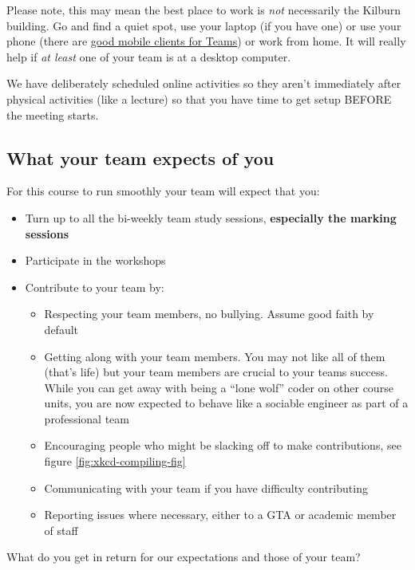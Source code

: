 \documentclass[
]{book}
\providecommand{\tightlist}{%
  \setlength{\itemsep}{0pt}\setlength{\parskip}{0pt}}
\begin{document}
Please note, this may mean the best place to work is \emph{not} necessarily the Kilburn building. Go and find a quiet spot, use your laptop (if you have one) or use your phone (there are \href{https://www.microsoft.com/en-gb/microsoft-teams/download-app}{good mobile clients for Teams}) or work from home. It will really help if \emph{at least} one of your team is at a desktop computer.

We have deliberately scheduled online activities so they aren't immediately after physical activities (like a lecture) so that you have time to get setup BEFORE the meeting starts.

\hypertarget{urteam}{%
\subsection{What your team expects of you}\label{urteam}}

For this course to run smoothly your team will expect that you:

\begin{itemize}
\tightlist
\item
  Turn up to all the bi-weekly team study sessions, \textbf{especially the marking sessions}
\item
  Participate in the workshops
\item
  Contribute to your team by:

  \begin{itemize}
  \tightlist
  \item
    Respecting your team members, no bullying. Assume good faith by default
  \item
    Getting along with your team members. You may not like all of them (that's life) but your team members are crucial to your teams success. While you can get away with being a ``lone wolf'' coder on other course units, you are now expected to behave like a sociable engineer as part of a professional team
  \item
    Encouraging people who might be slacking off to make contributions, see figure \ref{fig:xkcd-compiling-fig}
  \item
    Communicating with your team if you have difficulty contributing
  \item
    Reporting issues where necessary, either to a GTA or academic member of staff
  \end{itemize}
\end{itemize}

What do you get in return for our expectations and those of your team?
\end{document}
